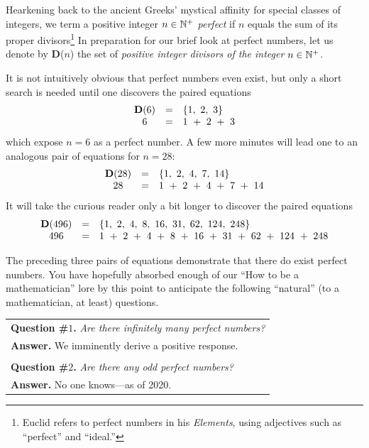 Hearkening back to the ancient Greeks' mystical affinity for special classes of integers, we term a positive integer $n \in \mathbb{N}^+$ {\it perfect} if $n$ equals the sum of its proper divisors\footnote{Euclid refers to perfect numbers in his {\it Elements}, using adjectives such as ``perfect'' and ``ideal.''}  In preparation for our brief look at perfect numbers, let us denote by {\bf D}($n$) the set of {\em positive integer divisors of the integer} $n \in \mathbb{N}^+$.

\medskip

It is not intuitively obvious that perfect numbers even exist, but only a short search is needed until one discovers the paired equations
\[ \begin{array}{ccl}
{\bf D}(6) & = & \{ 1, \ 2 , \ 3 \} \\
 6            & = & 1 \ +\ 2 \ + \ 3
\end{array} \]
which expose $n=6$ as a perfect number.  A few more minutes will lead one to an analogous pair of equations for $n=28$:
\[ \begin{array}{ccl}
{\bf D}(28) & = & \{ 1, \ 2, \ 4, \ 7, \ 14\} \\
28              & = &  1 \ + \ 2 \ + \ 4 \ + \ 7\ + \ 14
\end{array} \]
It will take the curious reader only a bit longer to discover the paired equations
\[ \begin{array}{ccl}
{\bf D}(496) & = & \{1, \ 2 , \ 4, \ 8, \ 16, \ 31, \ 62, \ 124, \ 248\} \\
496             & = &  1 \ + \ 2 \ + \ 4 \ + \ 8 \ + \ 16 \ + \ 31 \ + \ 62 \ + \ 124 \ + \ 248
\end{array} \]

\smallskip

The preceding three pairs of equations demonstrate that there do exist perfect numbers.  You have hopefully absorbed enough of our ``How to be a mathematician'' lore by this point to anticipate the following ``natural'' (to a mathematician, at least) questions.

\medskip

\begin{tabular}{l}
{\bf Question \#$1$.}  {\em Are there {\em infinitely many} perfect numbers?} \\
{\bf Answer.}  We imminently derive a positive response. \\
 \\
{\bf Question \#$2$.}  {\em Are there any {\em odd} perfect numbers?} \\
{\bf Answer.}  No one knows---as of 2020.
\end{tabular}

